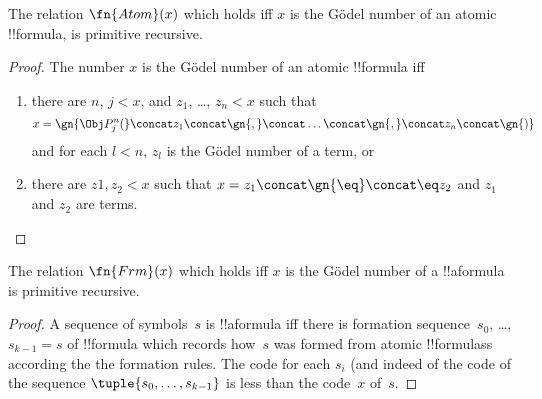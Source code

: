 \documentclass[../../include/open-logic-section]{subfiles}
\begin{document}

\begin{prop}
The relation $\fn{Atom}(x)$ which holds iff $x$ is the G\"odel number
of an atomic !!{formula}, is primitive recursive.
\end{prop}

\begin{proof}
The number $x$ is the G\"odel number of an atomic !!{formula} iff
\begin{enumerate}
\item there are $n$, $j < x$, and $z_1$, \dots, $z_n < x$ such that
\[
x = \gn{\Obj P^n_j(} \concat z_1 \concat \gn{,} \concat \dots \concat
\gn{,} \concat z_n \concat \gn{)}
\]
and for each $l < n$, $z_l$ is the G\"odel number of a term, or
\item there are $z1, z_2 < x$ such that $x = z_1 \concat \gn{\eq}
  \concat \eq z_2$ and $z_1$ and $z_2$ are terms.
\end{enumerate}
\end{proof}

\begin{prop}
The relation $\fn{Frm}(x)$ which holds iff $x$ is the G\"odel number
of a !!a{formula} is primitive recursive.
\end{prop}

\begin{proof}
A sequence of symbols~$s$ is !!a{formula} iff there is formation
sequence~$s_0$, \dots, $s_{k-1} = s$ of !!{formula} which records
how~$s$ was formed from atomic !!{formulas}s according the the
formation rules.  The code for each $s_i$ (and indeed of the code of
the sequence $\tuple{s_0, \dots, s_{k-1}}$ is less than the code~$x$
of~$s$.
\end{proof}
\end{document}
